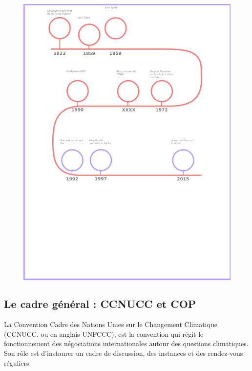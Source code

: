 \begin{figure}
    \centering
    \includegraphics[width=\linewidth]{illustrations/frise.png}
    \label{fig:frise}
\end{figure}

\subsection{Le cadre général : CCNUCC et COP}
\label{sect:1.2.2}


La Convention Cadre des Nations Unies sur le Changement Climatique (CCNUCC, ou en anglais UNFCCC), est la convention qui régit le fonctionnement des négociations internationales autour des questions climatiques. Son rôle est d'instaurer un cadre de discussion, des instances et des rendez-vous réguliers. \\

